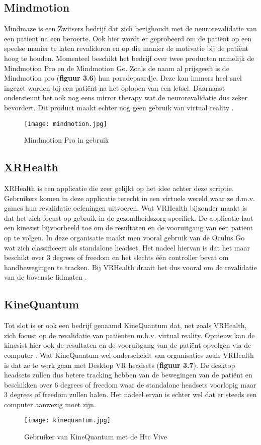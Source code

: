 \subsection{Mindmotion}
Mindmaze is een Zwitsers bedrijf dat zich bezighoudt met de neurorevalidatie van een patiënt na een beroerte. Ook hier wordt er geprobeerd om de patiënt op een speelse manier te laten revalideren en op die manier de motivatie bij de patiënt hoog te houden. Momenteel beschikt het bedrijf over twee producten namelijk de Mindmotion Pro en de Mindmotion Go. Zoals de naam al prijsgeeft is de Mindmotion pro (\textbf{figuur 3.6}) hun paradepaardje. Deze kan immers heel snel ingezet worden bij een patiënt na het oplopen van een letsel. Daarnaast ondersteunt het ook nog eens mirror therapy wat de neurorevalidatie dus zeker bevordert. Dit product maakt echter nog geen gebruik van virtual reality \autocite{Mindmotion2019}.

\begin{figure}[h]
    \centering
    \texttt{[image: mindmotion.jpg]}
    \caption{Mindmotion Pro in gebruik \autocite{Mindmotion2019}}
\end{figure}

\subsection{XRHealth}
XRHealth is een applicatie die zeer gelijkt op het idee achter deze scriptie. Gebruikers komen in deze applicatie terecht in een virtuele wereld waar ze d.m.v. games hun revalidatie oefeningen uitvoeren. Wat VRHealth bijzonder maakt is dat het zich focust op gebruik in de gezondheidszorg specifiek. De applicatie laat een kinesist bijvoorbeeld toe om de resultaten en de vooruitgang van een patiënt op te volgen. In deze organisatie maakt men vooral gebruik van de Oculus Go wat zich classificeert als standalone headset. Het nadeel hiervan is dat het maar beschikt over 3 degrees of freedom en het slechts één controller bevat om handbewegingen te tracken. Bij VRHealth draait het dus vooral om de revalidatie van de bovenste lidmaten \autocite{XRHealth2019}. 

\subsection{KineQuantum}
Tot slot is er ook een bedrijf genaamd KineQuantum dat, net zoals VRHealth, zich focust op de revalidatie van patiënten m.b.v. virtual reality. Opnieuw kan de kinesist hier ook de resultaten en de vooruitgang van de patiënt opvolgen via de computer \autocite{KineQuantum2019}. Wat KineQuantum wel onderscheidt van organisaties zoals VRHealth is dat ze te werk gaan met Desktop VR headsets (\textbf{figuur 3.7}). De desktop headsets zullen dus betere tracking hebben van de bewegingen van de patiënt en beschikken over 6 degrees of freedom waar de standalone headsets voorlopig maar 3 degrees of freedom zullen halen. Het nadeel ervan is echter wel dat er steeds een computer aanwezig moet zijn. 

\begin{figure}[h]
    \centering
    \texttt{[image: kinequantum.jpg]}
    \caption{Gebruiker van KineQuantum met de Htc Vive \autocite{Bergmann2018}}
\end{figure}
